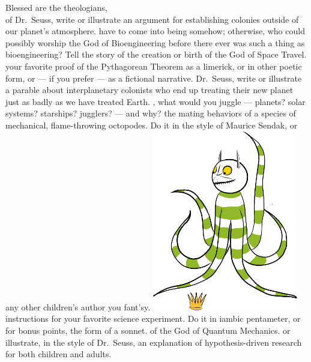 \bverse Blessed are the theologians, \\
\newpage
\newpage%
\bversenonum {} of Dr.~Seuss, write or illustrate an argument for establishing colonies outside of our planet's atmosphere.
\newpage%
\bversenonum {} have to come into being somehow; otherwise, who could possibly worship the God of Bioengineering before there ever was such a thing as bioengineering? Tell the story of the creation or birth of the God of Space Travel.
\newpage%
\bversenonum {} your favorite proof of the Pythagorean Theorem as a limerick, or in other poetic form, or --- if you prefer --- as a fictional narrative.
\newpage
\newpage%
\bversenonum {} Dr.~Seuss, write or illustrate a parable about interplanetary colonists who end up treating their new planet just as badly as we have treated Earth.
\newpage%
\bversenonum {}, what would you juggle --- planets? solar systems? starships? jugglers? --- and why?
\newpage%
\bversenonum {} the mating behaviors of a species of mechanical, flame-throwing octopodes. Do it in the style of Maurice Sendak, or any other children's author you fant'sy.
\newpage
\hfill\includegraphics[width=2.5in]{images/wild_things.pdf}
\newpage%
\bversenonum {} instructions for your favorite science experiment. Do it in iambic pentameter, or for bonus points, the form of a sonnet.
\newpage%
\bversenonum {} of the God of Quantum Mechanics.
\newpage%
\bversenonum {} or illustrate, in the style of Dr.~Seuss, an explanation of hypothesis-driven research for both children and adults.
